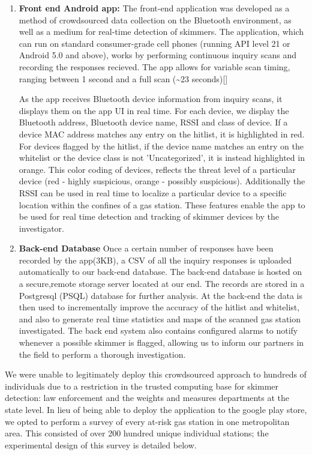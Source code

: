 \begin{enumerate}
\item \textbf{Front end Android app: } The front-end application was developed
as a method of crowdsourced data collection on the Bluetooth environment, as
well as a medium for real-time detection of skimmers. The application, which can
run on standard consumer-grade cell phones (running API level 21 or Android 5.0
and above), works by performing continuous inquiry scans and recording the
responses recieved. The app allows for variable scan timing, ranging between 1
second and a full scan (\textasciitilde23 seconds)[]

As the app receives Bluetooth device information from inquiry scans, it displays
them on the app UI in real time. For each device, we display the Bluetooth
address, Bluetooth device name, RSSI and class of device. If a device MAC
address matches any entry on the hitlist, it is highlighted in red. For devices
flagged by the hitlist, if the device name matches an entry on the whitelist or
the device class is not 'Uncategorized', it is instead highlighted in
orange. This color coding of devices, reflects the threat level of a particular
device (red - highly suspicious, orange - possibly suspicious). Additionally the
RSSI can be used in real time to localize a particular device to a specific
location within the confines of a gas station. These features enable the app to
be used for real time detection and tracking of skimmer devices by the
investigator.

\item \textbf{Back-end Database} Once a certain number of responses have been
recorded by the app(3KB), a CSV of all the inquiry responses is uploaded
automatically to our back-end database. The back-end database is hosted on a
secure,remote storage server located at our end. The records are stored in a
Postgresql (PSQL) database for further analysis. At the back-end the data is
then used to incrementally improve the accuracy of the hitlist and whitelist,
and also to generate real time statistics and maps of the scanned gas station
investigated. The back end system also contains configured alarms to notify
whenever a possible skimmer is flagged, allowing us to inform our partners in
the field to perform a thorough investigation.
\end{enumerate}

We were unable to legitimately deploy this crowdsourced approach to hundreds of
individuals due to a restriction in the trusted computing base for skimmer
detection: law enforcement and the weights and measures departments at the state
level. In lieu of being able to deploy the application to the google play store,
we opted to perform a survey of every at-risk gas station in one metropolitan
area. This consisted of over 200 hundred unique individual stations; the
experimental design of this survey is detailed below.  \fi %
